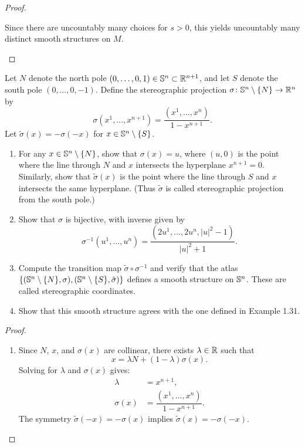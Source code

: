 \begin{problem}
\begin{proof}
\begin{enumerate}
      Since there are uncountably many choices for $s > 0$, this yields uncountably many distinct smooth structures on $M$.
    \end{enumerate}
  \end{proof}
\end{problem}

\begin{problem}
  Let $N$ denote the north pole $(0,\dots,0,1) \in \mathbb{S}^n \subset \mathbb{R}^{n+1}$, and let $S$ denote the south pole $(0,\dots,0,-1)$. Define the stereographic projection $\sigma\colon \mathbb{S}^n \setminus \{N\} \to \mathbb{R}^n$ by$$\sigma(x^1,\dots,x^{n+1}) = \frac{(x^1,\dots,x^n)}{1 - x^{n+1}}.$$ Let $\tilde{\sigma}(x) = - \sigma(-x)$ for $x \in \mathbb{S}^n \setminus \{S\}$.
  \begin{enumerate}
    \item For any $x \in \mathbb{S}^n \setminus \{N\}$, show that $\sigma(x) = u$, where $(u,0)$ is the point where the line through $N$ and $x$ intersects the hyperplane $x^{n+1} = 0$. Similarly, show that $\tilde{\sigma}(x)$ is the point where the line through $S$ and $x$ intersects the same hyperplane. (Thus $\tilde{\sigma}$ is called stereographic projection from the south pole.)
    \item Show that $\sigma$ is bijective, with inverse given by$$\sigma^{-1}(u^1,\dots,u^n) = \frac{(2u^1,\dots,2u^n, |u|^2 - 1)}{|u|^2 + 1}.$$
    \item Compute the transition map $\tilde{\sigma} \circ \sigma^{-1}$ and verify that the atlas $\{(\mathbb{S}^n \setminus \{N\}, \sigma), (\mathbb{S}^n \setminus \{S\}, \tilde{\sigma})\}$ defines a smooth structure on $\mathbb{S}^n$. These are called stereographic coordinates.
    \item Show that this smooth structure agrees with the one defined in Example 1.31.
  \end{enumerate}
  \begin{proof}
    \begin{enumerate}
      \item Since $N$, $x$, and $\sigma(x)$ are collinear, there exists $\lambda \in \mathbb{R}$ such that 
      \begin{equation*}
        x = \lambda N + (1-\lambda)\sigma(x).
      \end{equation*}
      Solving for $\lambda$ and $\sigma(x)$ gives:
      \begin{align*}
        \lambda      &= x^{n+1}, \\[0.5em]
        \sigma(x)    &= \dfrac{(x^1, \dots, x^n)}{1 - x^{n+1}}.
      \end{align*}
      The symmetry $\tilde{\sigma}(-x) = -\sigma(x)$ implies $\tilde{\sigma}(x) = -\sigma(-x)$.


\end{enumerate}
\end{proof}
\end{problem}
